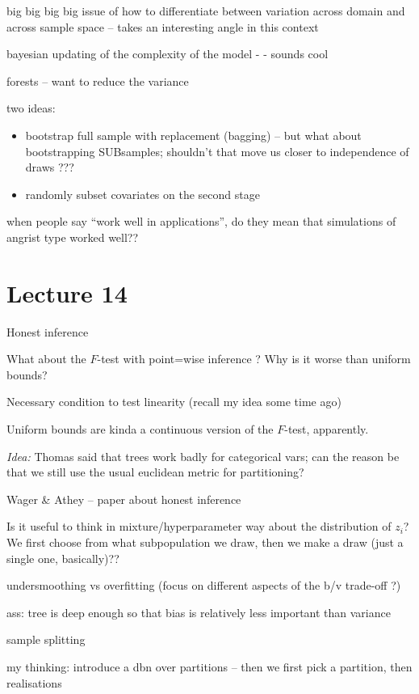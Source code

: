 \documentclass[a4paper,12pt,twoside]{article}
\begin{document}
big big big big issue of how to differentiate between variation across domain and across sample space -- takes an interesting angle in this context



bayesian updating of the complexity of the model - - sounds cool


forests -- want to reduce the variance


two ideas:

\begin{itemize}
	\item bootstrap full sample with replacement (bagging) -- but what about bootstrapping SUBsamples; shouldn't that move us closer to independence of draws ???
	\item randomly subset covariates on the second stage
\end{itemize}


when people say ``work well in applications'', do they mean that simulations of angrist type worked well??


\section*{Lecture 14}

Honest inference

What about the $F$-test with point=wise inference ? Why is it worse than uniform bounds?

Necessary condition to test linearity (recall my idea some time ago)

Uniform bounds are kinda a continuous version of the $F$-test, apparently.


\textit{Idea:} Thomas said that trees work badly for categorical vars; can the reason be that we still use the usual euclidean metric for partitioning?

Wager \& Athey -- paper about honest inference


Is it useful to think in mixture/hyperparameter way about the distribution of $z_i$? We first choose from what subpopulation we draw, then we make a draw (just a single one, basically)??


undersmoothing vs overfitting (focus on different aspects of the b/v trade-off ?)

ass: tree is deep enough so that bias is relatively less important than variance

sample splitting

my thinking: introduce a dbn over partitions -- then we first pick a partition, then realisations
\end{document}
